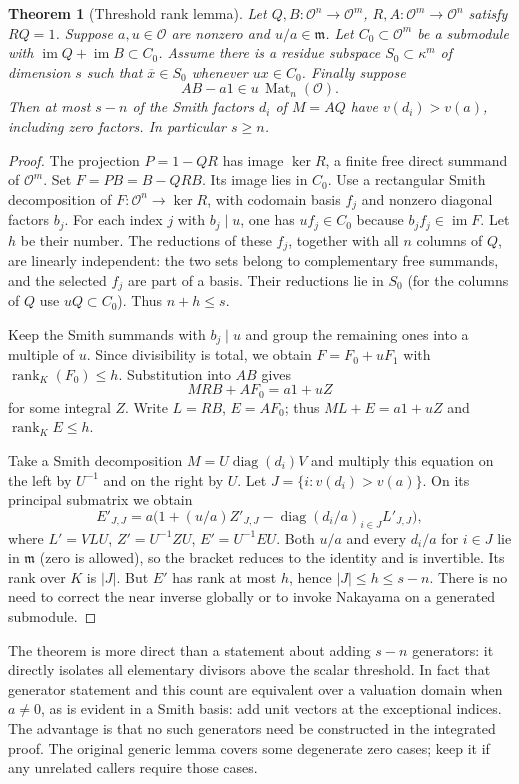\documentclass[11pt]{article}
\newtheorem{theorem}{Theorem}[section]
\newcommand{\OO}{\mathcal O}
\newcommand{\fr}{\mathfrak m}
\newcommand{\kk}{\kappa}
\newcommand{\rk}{\operatorname{rank}}
\newcommand{\im}{\operatorname{im}}
\newcommand{\diag}{\operatorname{diag}}
\begin{document}
\begin{theorem}[Threshold rank lemma]\label{thm:rank}
Let $Q,B:\OO^n\to\OO^m$, $R,A:\OO^m\to\OO^n$ satisfy $RQ=1$. Suppose $a,u\in\OO$ are nonzero and $u/a\in\fr$. Let $C_0\subset\OO^m$ be a submodule with $\im Q+\im B\subset C_0$. Assume there is a residue subspace $S_0\subset\kk^m$ of dimension $s$ such that $\overline{x}\in S_0$ whenever $ux\in C_0$. Finally suppose
\[
 AB-a1\in u\,\operatorname{Mat}_n(\OO).
\]
Then at most $s-n$ of the Smith factors $d_i$ of $M=AQ$ have $v(d_i)>v(a)$, including zero factors. In particular $s\ge n$.
\end{theorem}
\begin{proof}
The projection $P=1-QR$ has image $\ker R$, a finite free direct summand of $\OO^m$. Set $F=PB=B-QRB$. Its image lies in $C_0$. Use a rectangular Smith decomposition of $F:\OO^n\to\ker R$, with codomain basis $f_j$ and nonzero diagonal factors $b_j$. For each index $j$ with $b_j\mid u$, one has $uf_j\in C_0$ because $b_j f_j\in\im F$. Let $h$ be their number. The reductions of these $f_j$, together with all $n$ columns of $Q$, are linearly independent: the two sets belong to complementary free summands, and the selected $f_j$ are part of a basis. Their reductions lie in $S_0$ (for the columns of $Q$ use $uQ\subset C_0$). Thus $n+h\le s$.

Keep the Smith summands with $b_j\mid u$ and group the remaining ones into a multiple of $u$. Since divisibility is total, we obtain $F=F_0+uF_1$ with $\rk_K(F_0)\le h$. Substitution into $AB$ gives
\[
 M RB + A F_0 = a1+u Z
\]
for some integral $Z$. Write $L=RB$, $E=AF_0$; thus $ML+E=a1+uZ$ and $\rk_K E\le h$.

Take a Smith decomposition $M=U\diag(d_i)V$ and multiply this equation on the left by $U^{-1}$ and on the right by $U$. Let $J=\{i:v(d_i)>v(a)\}$. On its principal submatrix we obtain
\[
 E'_{J,J}=a\bigl(1+(u/a)Z'_{J,J}-\diag(d_i/a)_{i\in J} L'_{J,J}\bigr),
\]
where $L'=VLU$, $Z'=U^{-1}ZU$, $E'=U^{-1}EU$. Both $u/a$ and every $d_i/a$ for $i\in J$ lie in $\fr$ (zero is allowed), so the bracket reduces to the identity and is invertible. Its rank over $K$ is $|J|$. But $E'$ has rank at most $h$, hence $|J|\le h\le s-n$. There is no need to correct the near inverse globally or to invoke Nakayama on a generated submodule.
\end{proof}
The theorem is more direct than a statement about adding $s-n$ generators: it directly isolates all elementary divisors above the scalar threshold. In fact that generator statement and this count are equivalent over a valuation domain when $a\ne0$, as is evident in a Smith basis: add unit vectors at the exceptional indices. The advantage is that no such generators need be constructed in the integrated proof. The original generic lemma covers some degenerate zero cases; keep it if any unrelated callers require those cases.
\end{document}
